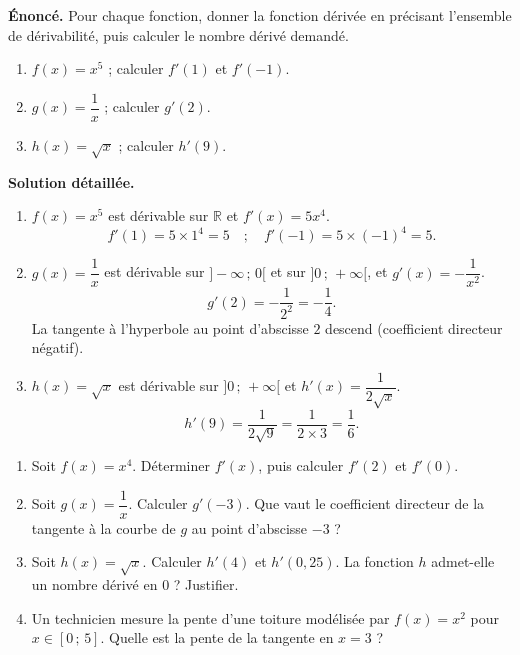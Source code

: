 \documentclass[11pt]{article}
\begin{document}
\begin{exoresolu}
\textbf{Énoncé.} Pour chaque fonction, donner la fonction dérivée en précisant l'ensemble de dérivabilité, puis calculer le nombre dérivé demandé.
\begin{enumerate}
\item $f(x) = x^5$ ; calculer $f'(1)$ et $f'(-1)$.
\item $g(x) = \dfrac{1}{x}$ ; calculer $g'(2)$.
\item $h(x) = \sqrt{x}$ ; calculer $h'(9)$.
\end{enumerate}
\tcblower
\textbf{Solution détaillée.}
\begin{enumerate}
\item $f(x) = x^5$ est dérivable sur $\mathbb{R}$ et $f'(x) = 5x^4$.
\[
f'(1) = 5 \times 1^4 = 5 \quad ; \quad f'(-1) = 5 \times (-1)^4 = 5.
\]
\item $g(x) = \dfrac{1}{x}$ est dérivable sur $]-\infty\,;\,0[$ et sur $]0\,;\,+\infty[$, et $g'(x) = -\dfrac{1}{x^2}$.
\[
g'(2) = -\frac{1}{2^2} = -\frac{1}{4}.
\]
La tangente à l'hyperbole au point d'abscisse $2$ descend (coefficient directeur négatif).
\item $h(x) = \sqrt{x}$ est dérivable sur $]0\,;\,+\infty[$ et $h'(x) = \dfrac{1}{2\sqrt{x}}$.
\[
h'(9) = \frac{1}{2\sqrt{9}} = \frac{1}{2 \times 3} = \frac{1}{6}.
\]
\end{enumerate}
\end{exoresolu}

\begin{exercice}
\begin{enumerate}
\item Soit $f(x) = x^4$. Déterminer $f'(x)$, puis calculer $f'(2)$ et $f'(0)$.
\item Soit $g(x) = \dfrac{1}{x}$. Calculer $g'(-3)$. Que vaut le coefficient directeur de la tangente à la courbe de $g$ au point d'abscisse $-3$ ?
\item Soit $h(x) = \sqrt{x}$. Calculer $h'(4)$ et $h'(0{,}25)$. La fonction $h$ admet-elle un nombre dérivé en $0$ ? Justifier.
\item Un technicien mesure la pente d'une toiture modélisée par $f(x) = x^2$ pour $x \in [0\,;\,5]$. Quelle est la pente de la tangente en $x = 3$ ?
\end{enumerate}
\end{exercice}
\end{document}

